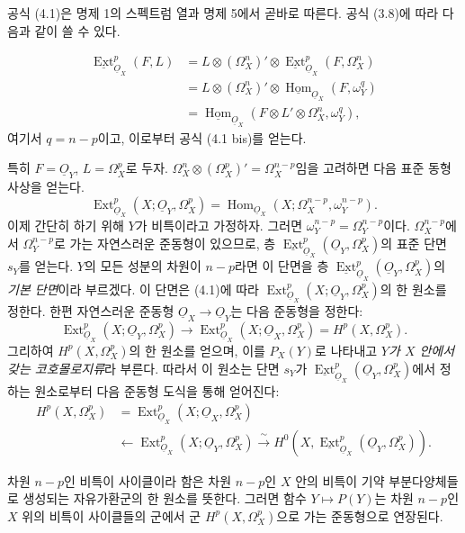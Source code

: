 \documentclass[11pt,twoside,openany]{book}
\numberwithin{equation}{section}
\newcommand{\sourceunit}{front}
\newcommand{\src}[1]{%
  \phantomsection\hypertarget{src:\sourceunit:#1}{}%
  \marginpar{\raggedleft\footnotesize\sffamily #1}%
}
\newcommand{\Osh}{\underline{O}}
\newcommand{\Homsh}{\underline{\operatorname{Hom}}}
\newcommand{\Extsh}{\underline{\operatorname{Ext}}}
\theoremstyle{plain}
\theoremstyle{definition}
\theoremstyle{remark}
\begin{document}
공식 (4.1)은 명제 1의 스펙트럼 열과 명제 5에서 곧바로 따른다. 공식
(3.8)에 따라 다음과 같이 쓸 수 있다.

\src{178}
\begin{align*}
\Extsh_{\Osh_X}^{p}(F,L)
&=L\otimes(\Omega_X^{n})'\otimes
  \Extsh_{\Osh_X}^{p}(F,\Omega_X^{n})\\
&=L\otimes(\Omega_X^{n})'\otimes
  \Homsh_{\Osh_X}(F,\omega_Y^{q})\\
&=\Homsh_{\Osh_X}\!\left(
  F\otimes L'\otimes\Omega_X^{n},\omega_Y^{q}\right),
\end{align*}
여기서 $q=n-p$이고, 이로부터 공식 (4.1 bis)를 얻는다.

특히 $F=\Osh_Y$, $L=\Omega_X^{p}$로 두자.
$\Omega_X^{n}\otimes(\Omega_X^{p})'=\Omega_X^{n-p}$임을 고려하면 다음 표준
동형사상을 얻는다.
\begin{equation}\tag{4.2}
  \operatorname{Ext}_{\Osh_X}^{p}(X;\Osh_Y,\Omega_X^{p})
  =\operatorname{Hom}_{\Osh_X}
  (X;\Omega_X^{n-p},\omega_Y^{n-p}).
\end{equation}
이제 간단히 하기 위해 $Y$가 비특이라고 가정하자. 그러면
$\omega_Y^{n-p}=\Omega_Y^{n-p}$이다. $\Omega_X^{n-p}$에서
$\Omega_Y^{n-p}$로 가는 자연스러운 준동형이 있으므로, 층
$\Extsh_{\Osh_X}^{p}(\Osh_Y,\Omega_X^{p})$의 표준 단면 $s_Y$를 얻는다.
$Y$의 모든 성분의 차원이 $n-p$라면 이 단면을 층
$\Extsh_{\Osh_X}^{p}(\Osh_Y,\Omega_X^{p})$의 \emph{기본 단면}이라 부르겠다.
이 단면은 (4.1)에 따라
$\operatorname{Ext}_{\Osh_X}^{p}(X;\Osh_Y,\Omega_X^{p})$의 한 원소를 정한다. 한편
자연스러운 준동형 $\Osh_X\longrightarrow\Osh_Y$는 다음 준동형을 정한다:
\[
  \operatorname{Ext}_{\Osh_X}^{p}(X;\Osh_Y,\Omega_X^{p})
  \longrightarrow
  \operatorname{Ext}_{\Osh_X}^{p}(X;\Osh_X,\Omega_X^{p})
  =H^{p}(X,\Omega_X^{p}).
\]
그리하여 $H^{p}(X,\Omega_X^{p})$의 한 원소를 얻으며, 이를 $P_X(Y)$로 나타내고
\emph{$Y$가 $X$ 안에서 갖는 코호몰로지류}라 부른다. 따라서 이 원소는 단면
$s_Y$가 $\Extsh_{\Osh_X}^{p}(\Osh_Y,\Omega_X^{p})$에서 정하는 원소로부터 다음
준동형 도식을 통해 얻어진다:
\begin{equation}\tag{4.3}
\begin{aligned}
H^{p}(X,\Omega_X^{p})
&=\operatorname{Ext}_{\Osh_X}^{p}(X;\Osh_X,\Omega_X^{p})\\
&\longleftarrow\operatorname{Ext}_{\Osh_X}^{p}(X;\Osh_Y,\Omega_X^{p})
\xrightarrow{\ \sim\ }
H^{0}\!\left(X,\Extsh_{\Osh_X}^{p}(\Osh_Y,\Omega_X^{p})\right).
\end{aligned}
\end{equation}

차원 $n-p$인 비특이 사이클이라 함은 차원 $n-p$인 $X$ 안의 비특이 기약
부분다양체들로 생성되는 자유가환군의 한 원소를 뜻한다. 그러면 함수
$Y\longmapsto P(Y)$는 차원 $n-p$인 $X$ 위의 비특이 사이클들의 군에서
군 $H^{p}(X,\Omega_X^{p})$으로 가는 준동형으로 연장된다.
\end{document}
